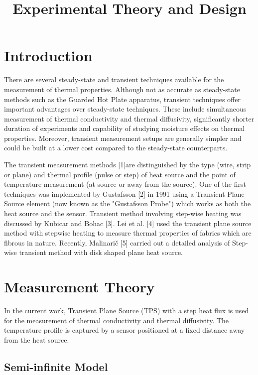 \documentclass[12pt]{article}
\begin{document}

\title{Experimental Theory and Design}

\section*{Introduction}


There are several steady-state and transient techniques available for the measurement of thermal properties. Although not as accurate as steady-state methods such as the Guarded Hot Plate apparatus, transient techniques offer important advantages over steady-state techniques. These include simultaneous measurement of thermal conductivity and thermal diffusivity, significantly shorter duration of experiments and capability of studying moisture effects on thermal properties.  Moreover, transient measurement setups are generally simpler and could be built at a lower cost compared to the steady-state counterparts.

The transient measurement methods [1]are distinguished by the type (wire, strip or plane) and thermal profile (pulse or step) of heat source and the point of temperature measurement (at source or away from the source). One of the first techniques was implemented by Gustafsson [2] in 1991 using a Transient Plane Source element (now known as the "Gustafsson Probe") which works as both the heat source and the sensor. Transient method involving step-wise heating was discussed by Kubicar and Bohac [3].  Lei et al. [4] used the transient plane source method with stepwise heating to measure thermal properties of fabrics which are fibrous in nature. Recently, Malinarič [5] carried out a detailed analysis of Step-wise transient method with disk shaped plane heat source. 

\section*{Measurement Theory}

In the current work, Transient Plane Source (TPS) with a step heat flux is used for the measurement of thermal conductivity and thermal diffusivity. The temperature profile is captured by a sensor positioned at a fixed distance away from the heat source. 

\subsection*{Semi-infinite Model}
\end{document}
